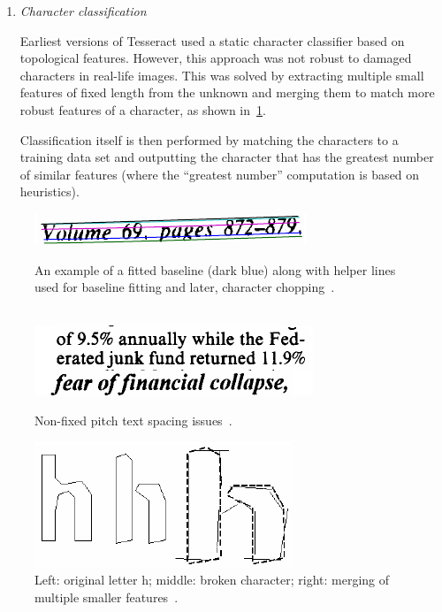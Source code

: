 \begin{enumerate}
    \item \emph{Character classification}
    
    Earliest versions of Tesseract used a static character classifier based on topological features. However, this approach was not robust to damaged characters in real-life images. This was solved by extracting multiple small features of fixed length from the unknown and merging them to match more robust features of a character, as shown in~\cref{fig:textRecTesseractChars}.
    
    Classification itself is then performed by matching the characters to a training data set and outputting the character that has the greatest number of similar features (where the ``greatest number'' computation is based on heuristics).
    
\end{enumerate}

\begin{figure}[t]
\minipage{\textwidth}
    \centering
    \includegraphics[width=0.7\linewidth]{img/textDetection/tesseractBaseline.png}
    \caption{An example of a fitted baseline (dark blue) along with helper lines used for baseline fitting and later, character chopping~\citep{smith2007overview}.}
    \label{fig:textRecTesseractBaseline}
\endminipage\\
    \includegraphics[width=\linewidth]{img/textDetection/tesseractSpacing.png}
    \caption{Non-fixed pitch text spacing issues~\citep{smith2007overview}.}
    \label{fig:textRecTesseractSpacing}
\endminipage\hfill
{}
    \includegraphics[width=\linewidth]{img/textDetection/tesseractCharacters.png}
    \caption{Left: original letter h; middle: broken character; right: merging of multiple smaller features~\citep{smith2007overview}.}
    \label{fig:textRecTesseractChars}
\endminipage
\end{figure}
